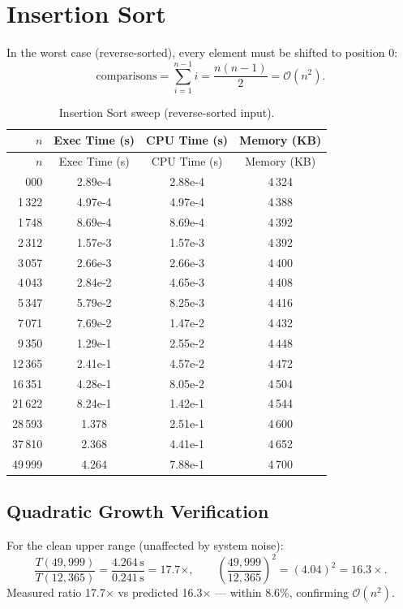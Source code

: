 \documentclass[12pt,a4paper]{report}
\begin{document}
\section{Insertion Sort}

In the worst case (reverse-sorted), every element must be shifted to position 0:
\[
  \text{comparisons} = \sum_{i=1}^{n-1} i = \frac{n(n-1)}{2} = \mathcal{O}(n^2).
\]

\begin{longtable}{rSSS}
\caption{Insertion Sort sweep (reverse-sorted input).}
\label{tab:insertion}\\
\toprule
$n$ & {Exec Time (s)} & {CPU Time (s)} & {Memory (KB)} \\
\midrule
\endfirsthead
\toprule
$n$ & {Exec Time (s)} & {CPU Time (s)} & {Memory (KB)} \\
\midrule
\endhead
\bottomrule
{}\,000 & 2.89e-4 & 2.88e-4 & 4\,324 \\
  1\,322 & 4.97e-4 & 4.97e-4 & 4\,388 \\
  1\,748 & 8.69e-4 & 8.69e-4 & 4\,392 \\
  2\,312 & 1.57e-3 & 1.57e-3 & 4\,392 \\
  3\,057 & 2.66e-3 & 2.66e-3 & 4\,400 \\
  4\,043 & 2.84e-2 & 4.65e-3 & 4\,408 \\
  5\,347 & 5.79e-2 & 8.25e-3 & 4\,416 \\
  7\,071 & 7.69e-2 & 1.47e-2 & 4\,432 \\
  9\,350 & 1.29e-1 & 2.55e-2 & 4\,448 \\
 12\,365 & 2.41e-1 & 4.57e-2 & 4\,472 \\
 16\,351 & 4.28e-1 & 8.05e-2 & 4\,504 \\
 21\,622 & 8.24e-1 & 1.42e-1 & 4\,544 \\
 28\,593 & 1.378   & 2.51e-1 & 4\,600 \\
 37\,810 & 2.368   & 4.41e-1 & 4\,652 \\
 49\,999 & 4.264   & 7.88e-1 & 4\,700 \\
\end{longtable}

\subsection{Quadratic Growth Verification}

For the clean upper range (unaffected by system noise):
\[
  \frac{T(49{,}999)}{T(12{,}365)} = \frac{4.264\,\text{s}}{0.241\,\text{s}} = 17.7\times,
  \qquad
  \left(\frac{49{,}999}{12{,}365}\right)^2 = (4.04)^2 = 16.3\times.
\]
Measured ratio 17.7$\times$ vs predicted 16.3$\times$ --- within 8.6\%, confirming
$\mathcal{O}(n^2)$.
\end{document}
